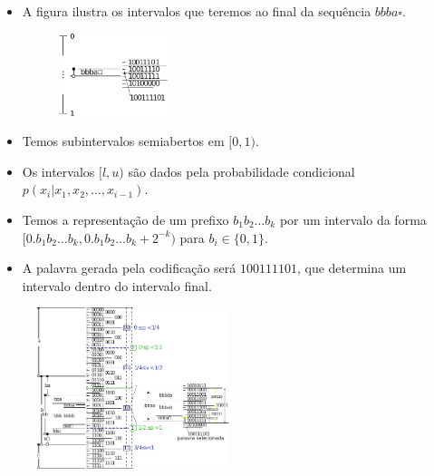 \begin{frame}[allowframebreaks]
\begin{example}
  \begin{itemize} 
  \item A figura ilustra os intervalos que teremos ao final da sequência $bbba\square$.

        \begin{figure}[h!]
        \centering
        \includegraphics[width=0.3\textwidth]{images/bbba.pdf}
        \label{fig:bbba}
        \end{figure}
  \end{itemize}

  \examplebreak

  \begin{itemize}
  \item Temos subintervalos semiabertos em $[0,1)$.
  \item Os intervalos $[l,u)$ são dados pela probabilidade condicional $p(x_i | x_1, x_2, \ldots, x_{i-1})$. 
  \item Temos a representação de um prefixo $b_1 b_2 \ldots b_k$ por um intervalo da forma
	$[0.b_1 b_2 \ldots b_k, 0.b_1 b_2 \ldots b_k + 2^{-k})$ para $b_i \in \{0,1\}$.
  \item A palavra gerada pela codificação será $100111101$, que determina um intervalo dentro do 
	intervalo final. 
  \end{itemize}

  \examplebreak

	\vspace{-0.5cm}
        \begin{figure}[h!]
        \centering
        \includegraphics[width=0.5\textwidth]{images/bbbaall.pdf}
        \label{fig:bbbaall}
        \end{figure}


\end{example}
\end{frame}
